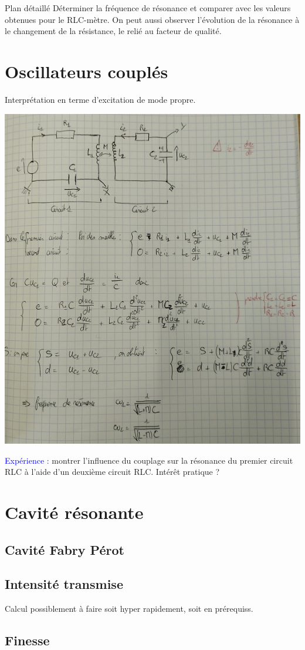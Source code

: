 \begin{reportBlock}{Plan détaillé}
Déterminer la fréquence de résonance et comparer avec les valeurs obtenues pour le RLC-mètre. On peut aussi observer l'évolution de la résonance à le changement de la résistance, le relié au facteur de qualité.

\section{Oscillateurs couplés}
Interprétation en terme d'excitation de mode propre.
\begin{center}
    \includegraphics[scale=0.5]{LP_Resonance/Oscillateurs_couple.jpg}
\end{center}    


\textcolor{blue}{Expérience : }montrer l'influence du couplage sur la résonance du premier circuit RLC à l'aide d'un deuxième circuit RLC. Intérêt pratique ?

\section{Cavité résonante}
\subsection{Cavité Fabry Pérot}
\subsection{Intensité transmise}
Calcul possiblement à faire soit hyper rapidement, soit en prérequiss.

\subsection{Finesse}
\end{reportBlock}